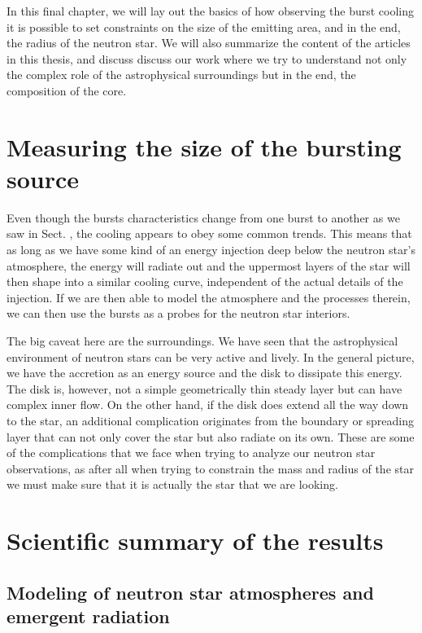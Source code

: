 In this final chapter, we will lay out the basics of how observing the burst cooling it is possible to set constraints on the size of the emitting area, and in the end, the radius of the neutron star.
We will also summarize the content of the articles in this thesis, and discuss discuss our work where we try to understand not only the complex role of the astrophysical surroundings but in the end, the composition of the core.


\section{Measuring the size of the bursting source}

Even though the bursts characteristics change from one burst to another as we saw in Sect. , the cooling appears to obey some common trends.
This means that as long as we have some kind of an energy injection deep below the neutron star's atmosphere, the energy will radiate out and the uppermost layers of the star will then shape into a similar cooling curve, independent of the actual details of the injection.
If we are then able to model the atmosphere and the processes therein, we can then use the bursts as a probes for the neutron star interiors.




The big caveat here are the surroundings.
We have seen that the astrophysical environment of neutron stars can be very active and lively.
In the general picture, we have the accretion as an energy source and the disk to dissipate this energy.
The disk is, however, not a simple geometrically thin steady layer but can have complex inner flow.
On the other hand, if the disk does extend all the way down to the star, an additional complication originates from the boundary or spreading layer that can not only cover the star but also radiate on its own.
These are some of the complications that we face when trying to analyze our neutron star observations, as after all when trying to constrain the mass and radius of the star we must make sure that it is actually the star that we are looking.


\section{Scientific summary of the results}

\subsection{Modeling of neutron star atmospheres and emergent radiation}


